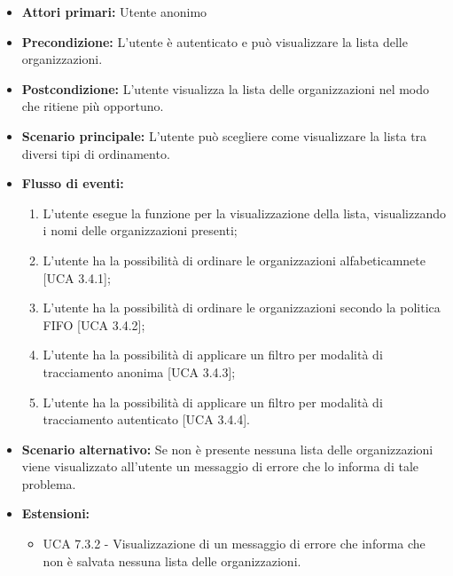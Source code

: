 \begin{itemize} 
	\item \textbf{Attori primari:} Utente anonimo
	\item \textbf{Precondizione:}  L'utente è autenticato e può visualizzare la lista delle organizzazioni.
	\item \textbf{Postcondizione:} L'utente visualizza la lista delle organizzazioni nel modo che ritiene più opportuno.
	\item \textbf{Scenario principale:}	L'utente può scegliere come visualizzare la lista tra diversi tipi di ordinamento.
	\item \textbf{Flusso di eventi:}
	\begin{enumerate}
		\item L'utente esegue la funzione per la visualizzazione della lista, visualizzando i nomi delle organizzazioni presenti;
		\item L'utente ha la possibilità di ordinare le organizzazioni alfabeticamnete [UCA 3.4.1];
		\item L'utente ha la possibilità di ordinare le organizzazioni secondo la politica FIFO [UCA 3.4.2];
		\item L'utente ha la possibilità di applicare un filtro per modalità di tracciamento anonima [UCA 3.4.3];
		\item L'utente ha la possibilità di applicare un filtro per modalità di tracciamento autenticato [UCA 3.4.4].
	\end{enumerate}
	\item \textbf{Scenario alternativo:} Se non è presente nessuna lista delle organizzazioni viene visualizzato all'utente un messaggio di errore che lo informa di tale problema.
	\item \textbf{Estensioni:}
	\begin{itemize}
		\item UCA 7.3.2 - Visualizzazione di un messaggio di errore che informa che non è salvata nessuna lista delle organizzazioni.
	\end{itemize}
\end{itemize}

